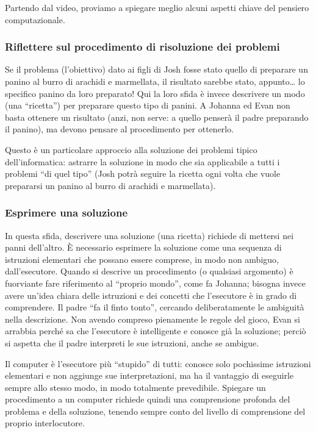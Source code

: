Partendo dal video, proviamo a spiegare meglio alcuni aspetti chiave del pensiero computazionale.


\subsubsection{Riflettere sul procedimento di risoluzione dei problemi}

Se il problema (l'obiettivo) dato ai figli di Josh fosse stato quello di preparare un panino al burro di arachidi e marmellata, il risultato sarebbe stato, appunto\ldots{} lo specifico panino da loro preparato! Qui la loro sfida è invece descrivere un modo (una ``ricetta'') per preparare questo tipo di panini. A Johanna ed Evan non basta ottenere un risultato (anzi, non serve: a quello penserà il padre preparando il panino), ma devono pensare al procedimento per ottenerlo.


Questo è un particolare approccio alla soluzione dei problemi tipico dell'informatica: astrarre la soluzione in modo che sia applicabile a tutti i problemi ``di quel tipo'' (Josh potrà seguire la ricetta ogni volta che vuole prepararsi un panino al burro di arachidi e marmellata).


\subsubsection{Esprimere una soluzione}


In questa sfida, descrivere una soluzione (una ricetta) richiede di mettersi nei panni dell'altro. È necessario esprimere la soluzione come una sequenza di istruzioni elementari che possano essere comprese, in modo non ambiguo, dall'esecutore. Quando si descrive un procedimento (o qualsiasi argomento) è fuorviante fare riferimento al ``proprio mondo'', come fa Johanna; bisogna invece avere un'idea chiara delle istruzioni e dei concetti che l'esecutore è in grado di comprendere. Il padre ``fa il finto tonto'', cercando deliberatamente le ambiguità nella descrizione. Non avendo compreso pienamente le regole del gioco, Evan si arrabbia perché sa che l'esecutore è intelligente e conosce già la soluzione; perciò si aspetta che il padre interpreti le sue istruzioni, anche se ambigue.

Il computer è l'esecutore più ``stupido'' di tutti: conosce solo pochissime istruzioni elementari e non aggiunge sue interpretazioni, ma ha il vantaggio di eseguirle sempre allo stesso modo, in modo totalmente prevedibile. Spiegare un procedimento a un computer richiede quindi una comprensione profonda del problema e della soluzione, tenendo sempre conto del livello di comprensione del proprio interlocutore.

